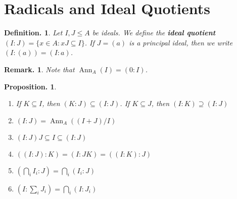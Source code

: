 \documentclass[11pt, a4paper]{memoir}
\theoremstyle{change}
\newtheorem{proposition}[theorem]{Proposition.}
\theoremstyle{plain}
\theoremstyle{nonumberplain}
\newtheorem{definition}{Definition.}
\newtheorem{remark}{Remark.}
\DeclareMathOperator{\Ann}{Ann}
\numberwithin{equation}{section}
\begin{document}
\section{Radicals and Ideal Quotients}
\begin{definition}
    Let $I,J\leq A$ be ideals.
    We define the \textbf{ideal quotient} $(I:J)=\{x\in A:xJ\subseteq I\}$.
    If $J=(a)$ is a principal ideal, then we write $(I:(a))=(I:a)$.
\end{definition}
\begin{remark}
    Note that $\Ann_A(I)=(0:I)$.
\end{remark}
\begin{proposition}
    \begin{enumerate}[nl,r]
        \item If $K\subseteq I$, then $(K:J)\subseteq(I:J)$.
            If $K\subseteq J$, then $(I:K)\supseteq(I:J)$
        \item $(I:J)=\Ann_A((I+J)/I)$
        \item $(I:J)J\subseteq I\subseteq (I:J)$
        \item $((I:J):K)=(I:JK)=((I:K):J)$
        \item $\left(\bigcap_i I_i:J\right)=\bigcap_i(I_i:J)$
        \item $\left(I:\sum_i J_i\right)=\bigcap_i(I:J_i)$
    \end{enumerate}
\end{proposition}
\end{document}
